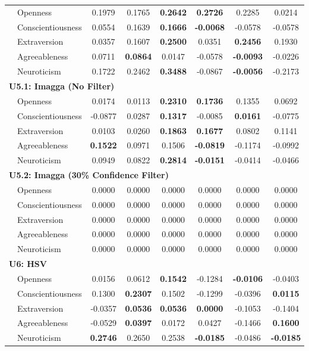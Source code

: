 \begin{longtable}{llcccccc}
& Openness & 0.1979 & 0.1765 & \textbf{0.2642} & \textbf{0.2726} & 0.2285 & 0.0214 \\
& Conscientiousness & 0.0554 & 0.1639 & \textbf{0.1666} & \textbf{-0.0068} & -0.0578 & -0.0578 \\
& Extraversion & 0.0357 & 0.1607 & \textbf{0.2500} & 0.0351 & \textbf{0.2456} & 0.1930 \\
& Agreeableness & 0.0711 & \textbf{0.0864} & 0.0147 & -0.0578 & \textbf{-0.0093} & -0.0226 \\
& Neuroticism & 0.1722 & 0.2462 & \textbf{0.3488} & -0.0867 & \textbf{-0.0056} & -0.2173 \\

\hline
\multicolumn{8}{l}{\textbf{U5.1: Imagga (No Filter)}} \\

& Openness & 0.0174 & 0.0113 & \textbf{0.2310} & \textbf{0.1736} & 0.1355 & 0.0692 \\
& Conscientiousness & -0.0877 & 0.0287 & \textbf{0.1317} & -0.0085 & \textbf{0.0161} & -0.0775 \\
& Extraversion & 0.0103 & 0.0260 & \textbf{0.1863} & \textbf{0.1677} & 0.0802 & 0.1141 \\
& Agreeableness & \textbf{0.1522} & 0.0971 & 0.1506 & \textbf{-0.0819} & -0.1174 & -0.0992 \\
& Neuroticism & 0.0949 & 0.0822 & \textbf{0.2814} & \textbf{-0.0151} & -0.0414 & -0.0466 \\

\hline
\multicolumn{8}{l}{\textbf{U5.2: Imagga (30\% Confidence Filter)}} \\

& Openness & 0.0000 & 0.0000 & 0.0000 & 0.0000 & 0.0000 & 0.0000 \\
& Conscientiousness & 0.0000 & 0.0000 & 0.0000 & 0.0000 & 0.0000 & 0.0000 \\
& Extraversion & 0.0000 & 0.0000 & 0.0000 & 0.0000 & 0.0000 & 0.0000 \\
& Agreeableness & 0.0000 & 0.0000 & 0.0000 & 0.0000 & 0.0000 & 0.0000 \\
& Neuroticism & 0.0000 & 0.0000 & 0.0000 & 0.0000 & 0.0000 & 0.0000 \\

\hline
\multicolumn{8}{l}{\textbf{U6: HSV}} \\

& Openness & 0.0156 & 0.0612 & \textbf{0.1542} & -0.1284 & \textbf{-0.0106} & -0.0403 \\
& Conscientiousness & 0.1300 & \textbf{0.2307} & 0.1502 & -0.1299 & -0.0396 & \textbf{0.0115} \\
& Extraversion & -0.0357 & \textbf{0.0536} & \textbf{0.0536} & \textbf{0.0000} & -0.1053 & -0.1404 \\
& Agreeableness & -0.0529 & \textbf{0.0397} & 0.0172 & 0.0427 & -0.1466 & \textbf{0.1600} \\
& Neuroticism & \textbf{0.2746} & 0.2650 & 0.2538 & \textbf{-0.0185} & -0.0486 & \textbf{-0.0185} \\


\end{longtable}
